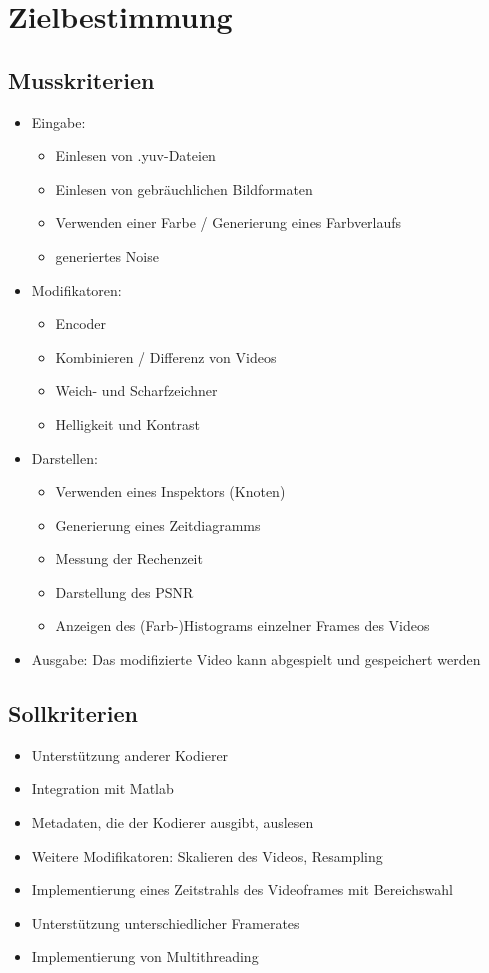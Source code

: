 \section{Zielbestimmung}

\subsection{Musskriterien}

\begin{itemize}
	\item Eingabe: 
	\begin{itemize}
		\item Einlesen von .yuv-Dateien
		\item Einlesen von gebräuchlichen Bildformaten
		\item Verwenden einer Farbe / Generierung eines Farbverlaufs
		\item generiertes Noise
	\end{itemize}
	\item Modifikatoren:
	\begin{itemize}
		\item Encoder
		\item Kombinieren / Differenz von Videos
		\item Weich- und Scharfzeichner
		\item Helligkeit und Kontrast
	\end{itemize}
	\item Darstellen:
	\begin{itemize}
		\item Verwenden eines Inspektors (Knoten)
		\item Generierung eines Zeitdiagramms
		\item Messung der Rechenzeit
		\item Darstellung des PSNR
		\item Anzeigen des (Farb-)Histograms einzelner Frames des Videos
	\end{itemize}
	\item Ausgabe: Das modifizierte Video kann abgespielt und gespeichert werden
\end{itemize}

\subsection{Sollkriterien}

\begin{itemize}
	\item Unterstützung anderer Kodierer
	\item Integration mit Matlab
	\item Metadaten, die der Kodierer ausgibt, auslesen
	\item Weitere Modifikatoren: Skalieren des Videos, Resampling
	\item Implementierung eines Zeitstrahls des Videoframes mit Bereichswahl
	\item Unterstützung unterschiedlicher Framerates 
	\item Implementierung von Multithreading
\end{itemize}

